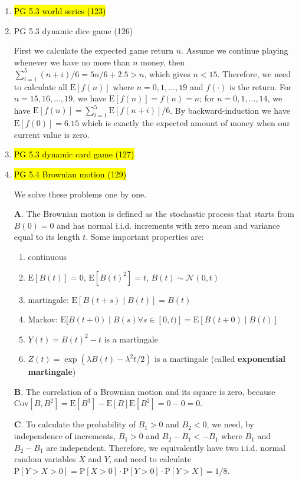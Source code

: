 \documentclass[11pt]{article}
\newcommand{\E}{\text{E}}
\newcommand{\Cov}{\text{Cov}}
\newcommand{\bs}{\boldsymbol}
\renewcommand{\P}{\text{P}}
\newenvironment{note}{\begin{enumerate}[leftmargin=1em,topsep=0pt,noitemsep]}{\end{enumerate}}
\newenvironment{nnote}{\begin{enumerate}[leftmargin=.95em,topsep=0pt,noitemsep,label=$\bs{\cdot}$]}{\end{enumerate}}
\newcommand{\solution}{\boxed{\textbf{SOLUTION}}\hspace{.5em}}
\begin{document}
\begin{spacing}{1.1}
\begin{note}
\item \hl{PG 5.3 world series (123)}

\item PG 5.3 dynamic dice game (126)

\solution First we calculate the expected game return $n$. Assume we continue playing whenever we have no more than $n$ money, then $\sum_{i=1}^5 (n+i)/6 = 5n/6 + 2.5 > n$, which gives $n < 15$. Therefore, we need to calculate all $\E[f(n)]$ where $n=0,1,\ldots,19$ and $f(\cdot)$ is the return. For $n=15,16,\ldots,19$, we have $\E[f(n)]=f(n)=n$; for $n=0,1,\ldots,14$, we have $\E[f(n)]=\sum_{i=1}^5 \E[f(n+i)]/6$. By backward-induction we have $\E[f(0)]=6.15$ which is exactly the expected amount of money when our current value is zero.

\item \hl{PG 5.3 dynamic card game (127)}

\item \hl{PG 5.4 Brownian motion (129)}

\solution We solve these problems one by one. 

\textbf{A}. The Brownian motion is defined as the stochastic process that starts from $B(0)=0$ and has normal i.i.d. increments with zero mean and variance equal to its length $t$. Some important properties are:

\begin{nnote}
\item continuous
\item $\E[B(t)]=0$, $\E[B(t)^2]=t$, $B(t)\sim\mathcal{N}(0,t)$
\item martingale: $\E[B(t+s)\mid B(t)]=B(t)$
\item Markov: $\E[B(t+0)\mid B(s) \forall s \in [0,t)]=\E[B(t+0)\mid B(t)]$
\item $Y(t)=B(t)^2-t$ is a martingale
\item $Z(t)=\exp(\lambda B(t)-\lambda^2t/2)$ is a martingale (called \textbf{exponential martingale})
\end{nnote}

\textbf{B}. The correlation of a Brownian motion and its square is zero, because $\Cov[B,B^2]=\E[B^3]-\E[B]\E[B^2]=0 - 0 = 0$.

\textbf{C}. To calculate the probability of $B_1>0$ and $B_2<0$, we need, by independence of increments, $B_1>0$ and $B_2-B_1<-B_1$ where $B_1$ and $B_2-B_1$ are independent. Therefore, we equivalently have two i.i.d. normal random variables $X$ and $Y$, and need to calculate $\P[Y>X>0]=\P[X>0]\cdot\P[Y>0]\cdot\P[Y>X] = 1/8$.


\end{note}
\end{spacing}
\end{document}

